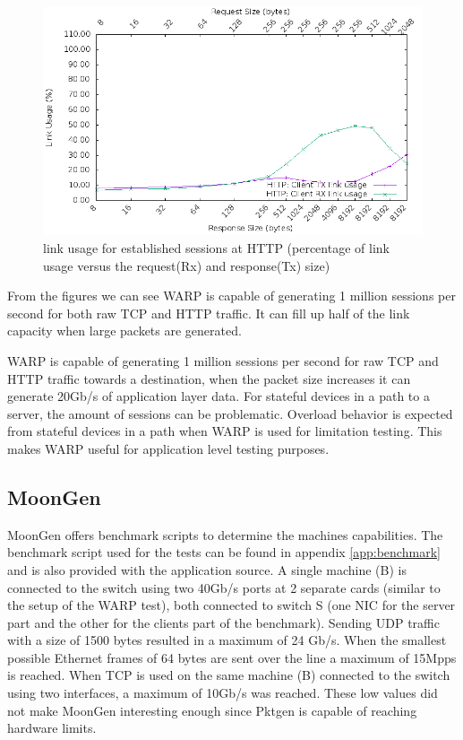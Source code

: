 \begin{figure}[H]
  \includegraphics[scale=0.6]{images/http_link_usage.png}
  \caption{link usage for established sessions at HTTP  (percentage of link usage versus the request(Rx) and response(Tx) size)}
  \label{fig:httplink}
\end{figure}

From the figures we can see WARP is capable of generating 1 million sessions per second for both raw TCP and HTTP traffic. 
It can fill up half of the link capacity when large packets are generated.

WARP is capable of generating 1 million sessions per second for raw TCP and HTTP traffic towards a destination, when the packet size increases it can generate 20Gb/s of application layer data.
For stateful devices in a path to a server, the amount of sessions can be problematic. Overload behavior is expected from stateful devices in a path when WARP is used for limitation testing.  
This makes WARP useful for application level testing purposes. 

\subsection{MoonGen}
MoonGen offers benchmark scripts to determine the machines capabilities. 
The benchmark script used for the tests can be found in appendix \ref{app:benchmark} and is also provided with the application source. 
A single machine (B) is connected to the switch using two 40Gb/s ports at 2 separate cards (similar to the setup of the WARP test), both connected to switch S (one NIC for the server part and the other for the clients part of the benchmark). Sending UDP traffic with a size of 1500 bytes resulted in a maximum of 24 Gb/s. When the smallest possible Ethernet frames of 64 bytes are sent over the line a maximum of 15Mpps is reached. When TCP is used on the same machine (B) connected to the switch using two interfaces, a maximum of 10Gb/s was reached. These low values did not make MoonGen interesting enough since Pktgen is capable of reaching hardware limits. 

